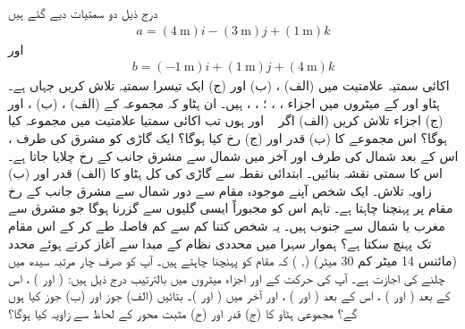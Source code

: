  درج ذیل دو سمتیات دیے گئے ہیں
\begin{align*} 
   a=(\SI{4}{\meter})i - (\SI{3}{\meter})j + (\SI{1}{\meter})k 
\end{align*}
    اور 
\begin{align*}
     b=(\SI{-1}{\meter})i + (\SI{1}{\meter})j + (\SI{4}{\meter})k 
\end{align*} 
   اکائی سمتیہ علامتیت میں  (الف)   ، (ب)   اور (ج) ایک تیسرا سمتیہ    تلاش کریں جہاں    ہے۔  
 ہٹاو    اور   کے میٹروں میں اجزاء  ،    ،  ؛   ،  ،  ہیں۔ ان ہٹاو کہ مجموعہ    کے  (الف) ، (ب) ، اور  (ج)  اجزاء  تلاش کریں  
  (الف) اگر  \   اور    ہوں تب اکائی سمتیا علامتیت میں مجموعہ   کیا ہوگا؟ اس مجموعے کا  (ب) قدر اور  (ج) رخ کیا ہوگا؟  
   ایک گاڑی کو مشرق کی طرف    ، اس کے بعد شمال کی طرف    اور آخر میں شمال سے مشرق جانب    کے رخ  چلایا جاتا ہے۔ اس کا سمتی نقشہ بنائیں۔ ابتدائی نقطہ سے گاڑی کی کل ہٹاو کا (الف) قدر اور  (ب) زاویہ تلاش۔   
ایک شخص آپنے موجودہ مقام سے    دور شمال سے مشرق جانب   کے رخ مقام پر پہنچنا چاہتا ہے۔ تاہم اس کو مجبوراً ایسی گلیوں سے گزرنا ہوگا جو مشرق سے مغرب یا شمال سے جنوب ہیں۔ یہ شخص کتنا کم سے کم فاصلہ طے کر کے اس مقام تک پہنچ سکتا ہے؟   
 ہموار سہرا میں  محددی نظام کے مبدا  سے آغاز کرتے ہوئے   محدد (مائنس 14 میٹر کم 30 میٹر) (, ) کہ مقام کو پہنچنا چاہتے ہیں۔ آپ کو صرف چار مرتبہ سیدھ میں چلنے کی اجازت ہے۔ آپ کی حرکت کے   اور    اجزاء میٹروں میں بالترتیب درج ذیل ہیں:   ( اور ) ، اس کے بعد   ( اور ) ، اس کے بعد   ( اور ) ، اور آخر میں  ( اور )۔  بتائیں  (الف) جوز   اور  (ب) جوز    کیا ہوں گے؟ مجموعی ہٹاو کا  (ج) قدر  اور  (ح) مثبت    محور کے لحاظ سے زاویہ کیا ہوگا؟   
